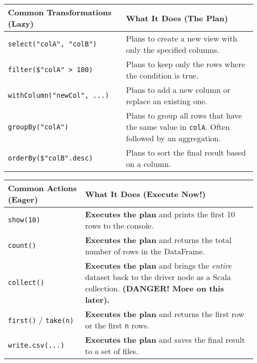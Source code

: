 \documentclass[
  letterpaper,
  DIV=11,
  numbers=noendperiod]{scrreprt}
\begin{document}
\begin{longtable}[]{@{}
  >{\raggedright\arraybackslash}p{}
  >{\raggedright\arraybackslash}p{}@{}}
\toprule\noalign{}
\begin{minipage}[b]{\linewidth}\raggedright
Common Transformations (Lazy)
\end{minipage} & \begin{minipage}[b]{\linewidth}\raggedright
What It Does (The Plan)
\end{minipage} \\
\midrule\noalign{}
\endhead
\bottomrule\noalign{}
\endlastfoot
\texttt{select("colA",\ "colB")} & Plans to create a new view with only
the specified columns. \\
\texttt{filter(\$"colA"\ \textgreater{}\ 100)} & Plans to keep only the
rows where the condition is true. \\
\texttt{withColumn("newCol",\ ...)} & Plans to add a new column or
replace an existing one. \\
\texttt{groupBy("colA")} & Plans to group all rows that have the same
value in \texttt{colA}. Often followed by an aggregation. \\
\texttt{orderBy(\$"colB".desc)} & Plans to sort the final result based
on a column. \\
\end{longtable}

\begin{longtable}[]{@{}
  >{\raggedright\arraybackslash}p{}
  >{\raggedright\arraybackslash}p{}@{}}
\toprule\noalign{}
\begin{minipage}[b]{\linewidth}\raggedright
Common Actions (Eager)
\end{minipage} & \begin{minipage}[b]{\linewidth}\raggedright
What It Does (Execute Now!)
\end{minipage} \\
\midrule\noalign{}
\endhead
\bottomrule\noalign{}
\endlastfoot
\texttt{show(10)} & \textbf{Executes the plan} and prints the first 10
rows to the console. \\
\texttt{count()} & \textbf{Executes the plan} and returns the total
number of rows in the DataFrame. \\
\texttt{collect()} & \textbf{Executes the plan} and brings the
\emph{entire} dataset back to the driver node as a Scala collection.
\textbf{(DANGER! More on this later).} \\
\texttt{first()} / \texttt{take(n)} & \textbf{Executes the plan} and
returns the first row or the first \texttt{n} rows. \\
\texttt{write.csv(...)} & \textbf{Executes the plan} and saves the final
result to a set of files. \\
\end{longtable}
\end{document}
